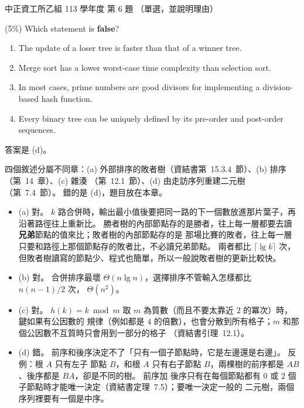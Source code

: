 \begin{pastexam}[label={px:ccu-113-csb-02}]{中正資工所乙組 113 學年度 第 6 題}
（單選，並說明理由）

(5\%) Which statement is \textbf{false}?
\begin{enumerate}[label=(\alph*),itemsep=0pt]
\item The update of a loser tree is faster than that of a winner tree.
\item Merge sort has a lower worst-case time complexity than selection sort.
\item In most cases, prime numbers are good divisors for implementing a division-based hash function.
\item Every binary tree can be uniquely defined by its pre-order and post-order sequences.
\end{enumerate}
\end{pastexam}

\begin{pastsoln}
答案是 (d)。

四個敘述分屬不同章：(a) 外部排序的敗者樹（資結書第~15.3.4~節）、(b) 排序（第~14~章）、(c) 雜湊
（第~12.1~節）、(d) 由走訪序列重建二元樹（第~7.4~節）。 錯的是 (d)，題目放在本章。
\begin{itemize}
\item (a) 對。 $k$ 路合併時，輸出最小值後要把同一路的下一個數放進那片葉子，再沿著路徑往上重新比。
勝者樹的內部節點存的是勝者，往上每一層都要去讀\textbf{兄弟}節點的值來比；敗者樹的內部節點存的是
那場比賽的敗者，往上每一層只要和路徑上那個節點存的敗者比，不必讀兄弟節點。 兩者都比
$\lceil \lg k \rceil$ 次，但敗者樹讀寫的節點少、程式也簡單，所以一般說敗者樹的更新比較快。
\item (b) 對。 合併排序最壞 $\Theta(n \lg n)$，選擇排序不管輸入怎樣都比 $n(n-1)/2$ 次，
$\Theta(n^2)$。
\item (c) 對。 $h(k) = k \bmod m$ 取 $m$ 為質數（而且不要太靠近 $2$ 的冪次）時，鍵如果有公因數的
規律（例如都是 $4$ 的倍數），也會分散到所有格子；$m$ 和那個公因數不互質時只會用到一部分的格子
（資結書引理~12.1）。
\item (d) 錯。 前序和後序決定不了「只有一個子節點時，它是左邊還是右邊」。 反例：根 $A$ 只有左子
節點 $B$，和根 $A$ 只有右子節點 $B$，兩棵樹的前序都是 $AB$、後序都是 $BA$，卻是不同的樹。 前序加
後序只有在每個節點都有 $0$ 或 $2$ 個子節點時才能唯一決定（資結書定理~7.5）；要唯一決定一般的
二元樹，兩個序列裡要有一個是中序。
\end{itemize}
\end{pastsoln}
